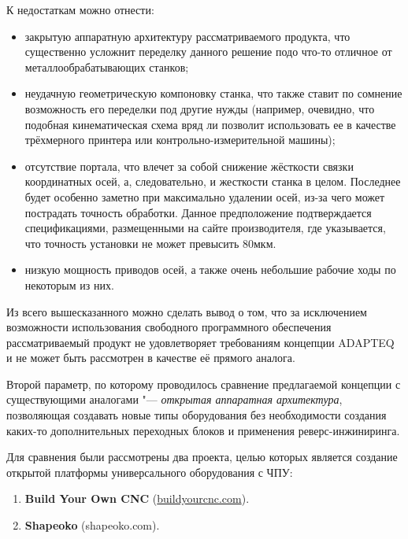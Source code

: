 К недостаткам можно отнести:
\begin{itemize}
	\item закрытую аппаратную архитектуру рассматриваемого продукта, что существенно усложнит переделку данного решение подо что-то отличное от металлообрабатывающих станков;
	
	\item неудачную геометрическую компоновку станка, что также ставит по сомнение возможность его переделки под другие нужды (например, очевидно, что подобная кинематическая схема вряд ли позволит использовать ее в качестве трёхмерного принтера или контрольно-измерительной машины);
	
	\item отсутствие портала, что влечет за собой снижение жёсткости связки координатных осей, а, следовательно, и жесткости станка в целом. Последнее будет особенно заметно при максимально удалении осей, из-за чего может пострадать точность обработки. Данное предположение подтверждается спецификациями, размещенными на сайте производителя, где указывается, что точность установки не может превысить 80мкм.
	
	\item низкую мощность приводов осей, а также очень небольшие рабочие ходы по некоторым из них.
	
	
\end{itemize}
Из всего вышесказанного можно сделать вывод о том, что за исключением возможности использования свободного программного обеспечения рассматриваемый продукт не удовлетворяет требованиям концепции ADAPTEQ и не может быть рассмотрен в качестве её прямого аналога.

Второй параметр, по которому проводилось сравнение предлагаемой концепции с существующими аналогами "--- \textit{открытая аппаратная архитектура}, позволяющая создавать новые типы оборудования без необходимости создания каких-то дополнительных переходных блоков и применения реверс-инжиниринга.

Для сравнения были рассмотрены два проекта, целью которых является создание открытой платформы универсального оборудования с ЧПУ:

\begin{enumerate}
	\item \foreignlanguage{english}{\textbf{Build Your Own CNC}} (\href{https://www.buildyourcnc.com/cnckit2.aspx}{\foreignlanguage{english}{buildyourcnc.com}}).
	
	\item \textbf{Shapeoko} (shapeoko.com).
\end{enumerate}


